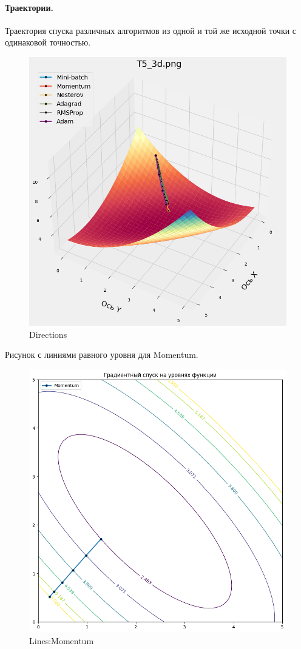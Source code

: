 \documentclass[12pt, a4paper, oneside, final]{article}
\begin{document}
	\paragraph{Траектории.}
	Траектория спуска различных алгоритмов из одной и той же исходной точки с одинаковой точностью.
	\begin{figure}[H]
		\centering
		\includegraphics[scale = 0.6]{Image/T5_DIRECTIONS.png}
		\caption*{Directions}
	\end{figure}\newpage
	Рисунок с линиями равного уровня для Momentum.
	\begin{figure}[H]
		\centering
		\includegraphics[scale = 0.6]{Image/T5_LINES_MOMENTUM.png}
		\caption*{Lines:Momentum}
	\end{figure}\newpage
\end{document}
